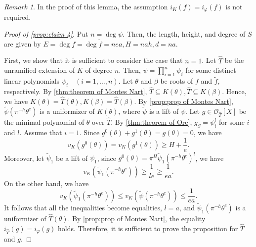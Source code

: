 \documentclass{article}
\theoremstyle{definition}
\theoremstyle{remark}
\newtheorem{remark}[theorem]{Remark}
\numberwithin{equation}{section}
\begin{document}
  \begin{remark}
    In the proof of this lemma, the assumption $i_K(f) = i_{\varphi}(f)$ is not required. 
  \end{remark}

  \begin{proof}[Proof of \cref{prop:claim 4}]
    Put $n = \deg \psi$. Then, the length, height, and degree of $S$ are given by 
    $E = \deg f = \deg \tilde{f} = nea, H = nah, d = na$. 

    First, we show that it is sufficient to consider the case that $n = 1$. 
    Let $\hat{T}$ be the unramified extension of $K$ of degree $n$. 
    Then, $\psi = \prod_{i = 1}^n \psi_i$ for some distinct linear polynomials $\psi_i \quad (i = 1, \dots ,n)$. 
    Let $\theta$ and $\beta$ be roots of $f$ and $\tilde{f}$, respectively. 
    By \cref{thm:theorem of Montes Nart}, $\hat{T} \subseteq K(\theta), \hat{T} \subseteq K(\beta)$. 
    Hence, we have $K(\theta) = \hat{T}(\theta), K(\beta) = \hat{T}(\beta)$. 
    By \cref{prop:prop of Montes Nart}, $\tilde{\psi}(\pi^{-h}\theta^e)$ is a uniformizer of $K(\theta)$, where $\tilde{\psi}$ is a lift of $\psi$. 
    Let $g \in \mathcal{O}_{\hat{T}}[X]$ be the minimal polynomial of $\theta$ over $\hat{T}$. 
    By \cref{thm:theorem of Ore}, $g_S = \psi_i^l$ for some $i$ and $l$. 
    Assume that $i = 1$. 
    Since $g^0(\theta) + g^1(\theta) = g(\theta) = 0$, we have 
    \[
      v_K(g^0(\theta)) = v_K(g^1(\theta)) \ge H + \frac{1}{e}. 
    \]
    Moreover, let $\tilde{\psi}_1$ be a lift of $\psi_1$, since $g^0(\theta) = \pi^H\tilde{\psi}_1(\pi^{-h}\theta^e)^l$, 
    we have 
    \[
      v_K(\tilde{\psi}_1(\pi^{-h}\theta^e)) \ge \frac{1}{le} \ge \frac{1}{ea}. 
    \]
    On the other hand, we have 
    \[
      v_K(\tilde{\psi}_1(\pi^{-h}\theta^e)) \le v_K(\tilde{\psi}(\pi^{-h}\theta^e)) \le \frac{1}{ea}. 
    \]
    It follows that all the inequalities become equalities, $l = a$, and $\tilde{\psi}_1(\pi^{-h}\theta^e)$ is a uniformizer of $\hat{T}(\theta)$. 
    By \cref{prop:prop of Montes Nart}, the equality $i_{\hat{T}}(g) = i_{\varphi}(g)$ holds. 
    Therefore, it is sufficient to prove the proposition for $\hat{T}$ and $g$. 


\end{proof}
\end{document}
